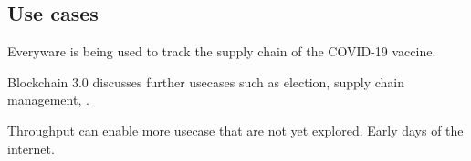 \subsection{Use cases}
Everyware is being used to track the supply chain of the COVID-19 vaccine.


Blockchain 3.0 discusses further usecases such as election, supply chain management, .

Throughput can enable more usecase that are not yet explored. Early days of the internet.
